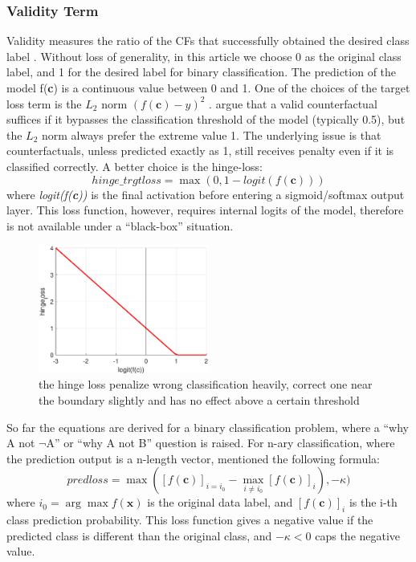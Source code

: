 \subsubsection{Validity Term} Validity measures the ratio of the CFs that successfully obtained the desired class label \cite{CFReview}. Without loss of generality, in this article we choose 0 as the original class label, and 1 for the desired label for binary classification. The prediction of the model f(\textbf{c}) is a continuous value between 0 and 1. One of the choices of the target loss term is the \emph{$L_2$} norm $(f(\textbf{c})-y)^2$ \cite{watcher2017}. \citeauthor{DiCE} \cite{DiCE} argue that a valid counterfactual suffices if it bypasses the classification threshold of the model (typically 0.5), but the \emph{$L_2$} norm always prefer the extreme value 1. The underlying issue is that counterfactuals, unless predicted exactly as 1, still receives penalty even if it is classified correctly. A better choice is the hinge-loss:
\begin{equation}\label{eq:hingeloss}
  hinge\_trgtloss=\max(0,1-logit(f(\textbf{c})))
\end{equation}
where \emph{logit(f(\textbf{c}))} is the final activation before entering a sigmoid/softmax output layer. This loss function, however, requires internal logits of the model, therefore is not available under a ``black-box'' situation.
\begin{figure}
  \centering
  \includegraphics[width=0.5\textwidth]{hingeloss.eps}
  \caption{the hinge loss penalize wrong classification heavily, correct one near the boundary slightly and has no effect above a certain threshold}\label{fig:hingeloss}
\end{figure}

So far the equations are derived for a binary classification problem, where a ``why A not $\neg${A}'' or ``why A not B'' question is raised. For n-ary classification, where the prediction output is a n-length vector, \citeauthor{prototype} \cite{prototype} mentioned the following formula:
\begin{equation}\label{eq:lossPred}
  predloss=\max([f(\textbf{c})]_{i=i_0}-\max_{i\neq i_0}[f(\textbf{c})]_i),-\kappa)
\end{equation}
where $i_0=\arg\max f(\textbf{x})$ is the original data label, and $[f(\textbf{c})]_i$ is the i-th class prediction probability. This loss function gives a negative value if the predicted class is different than the original class, and $-\kappa < 0$ caps the negative value.

